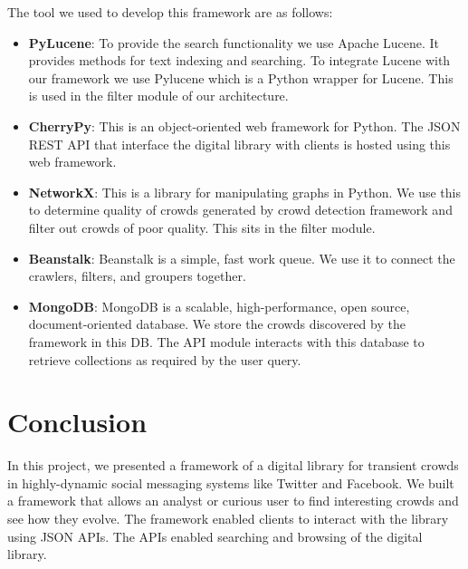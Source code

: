 \documentclass{sig-alternate}
\begin{document}
The tool we used to develop this framework are as follows:
\begin{itemize}
 \item \noindent\textbf{PyLucene}: To provide the search functionality we use Apache Lucene. It provides methods for text indexing and searching. To integrate Lucene with our framework we use Pylucene which is a Python wrapper for Lucene. This is used in the filter module of our architecture.
 \item \noindent\textbf{CherryPy}: This is an object-oriented web framework for Python. The JSON REST API that interface the digital library with clients is hosted using this web framework.
 \item \noindent\textbf{NetworkX}: This is a library for manipulating graphs in Python. We use this to determine quality of crowds generated by crowd detection framework and filter out crowds of poor quality. This sits in the filter module.
  \item \noindent\textbf{Beanstalk}: Beanstalk is a simple, fast work queue. We use it to connect the crawlers, filters, and groupers together.
   \item \noindent\textbf{MongoDB}: MongoDB is a scalable, high-performance, open source, document-oriented database. We store the crowds discovered by the framework in this DB. The API module interacts with this database to retrieve collections as required by the user query.
\end{itemize}

\section{Conclusion}
\label{sec:conclusion}
In this project, we presented a framework of a digital library for transient crowds in highly-dynamic social messaging systems like Twitter and Facebook. We built a framework that allows an analyst or curious user to find interesting crowds and see how they evolve.  The framework enabled clients to interact with the library using JSON APIs. The APIs enabled searching and browsing of the digital library.

{
 
 
}
\balancecolumns %
\end{document}
